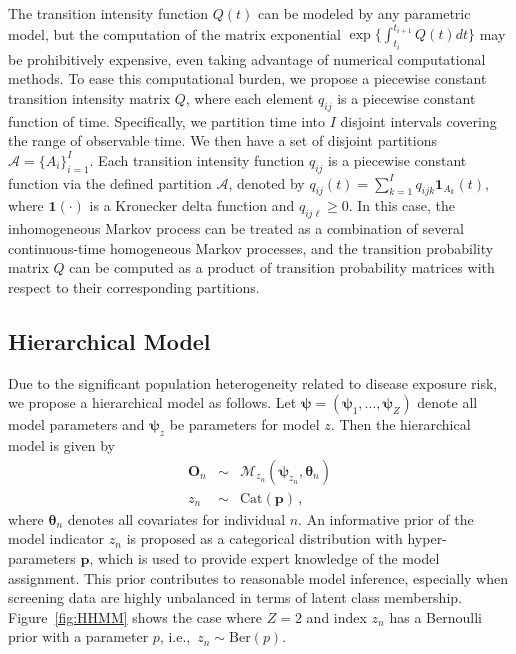 \documentclass{article}
\begin{document}
The transition intensity function $Q(t)$ can be modeled by any parametric model, but the computation of the matrix exponential $\exp\{{\int _{t_i}^{t_{i+1}}Q(t)dt}\}$ may be prohibitively expensive, even taking  advantage of numerical computational methods. To ease this computational burden, we propose a piecewise constant transition intensity matrix $Q$, where each element $q_{ij}$ is a piecewise constant function of time. Specifically, we partition time into $I$ disjoint intervals covering the range of observable time.  We then have a set of disjoint partitions $\mathcal{A} = \{ A_i\}_{i=1}^{I}$. Each transition intensity function $q_{ij}$ is a piecewise constant function via the defined partition $\mathcal{A}$, denoted by $q_{ij}(t) = \sum_{k = 1}^{I}q_{ijk} \bm 1_{A_k}(t)$, where $\bm 1(\cdot)$ is a Kronecker delta function and $q_{ij\ell} \geq 0$. In this case, the inhomogeneous Markov process can be treated as a combination of several continuous-time homogeneous Markov processes, and the transition probability matrix $Q$ can be computed as a product of transition probability matrices with respect to their corresponding partitions.

\subsection{Hierarchical Model}

Due to the significant population heterogeneity related to disease exposure risk, we propose a hierarchical model as follows. Let $\bm \psi = (\bm \psi_1, \ldots, \bm \psi_Z)$ denote all model parameters and $\bm \psi_z$ be parameters for model $z$. Then the hierarchical model is given by
\begin{eqnarray*}
	\bm O_n & \sim & \mathcal{M}_{z_n}(\bm \psi_{z_n}, \bm \theta_n) \\
	z_n & \sim & \mathrm{Cat}(\bm p)\,, 
\end{eqnarray*}
where $\bm \theta_n$ denotes all covariates for individual $n$. An informative prior of the model indicator $z_n$ is proposed as a categorical distribution with hyper-parameters $\bm p$, which is used to provide expert knowledge of the model assignment. This prior contributes to reasonable model inference, especially when screening data are highly unbalanced in terms of latent class membership.    Figure~\ref{fig:HHMM} shows the case where $Z=2$ and index $z_n$ has a Bernoulli prior with a parameter $p$, i.e.,\ $z_n \sim \mathrm{Ber}(p)$.
\end{document}
